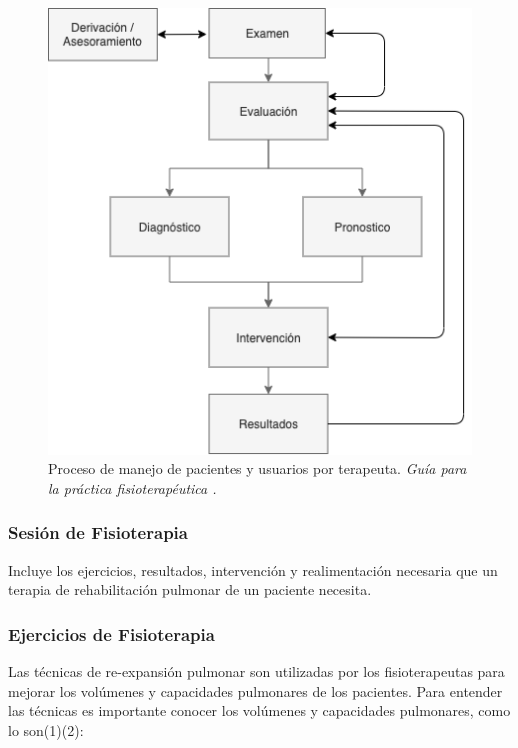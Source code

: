 \documentclass[12pt]{article}
\begin{document}
\begin{figure}[ht]
\centering
\includegraphics[scale=0.45]{imag/C4-Terapeuta.png}
\caption{Proceso de manejo de pacientes y usuarios por terapeuta. \textit{Guía para la práctica fisioterapéutica \cite{5}.}}
\label{2}
\end{figure}
\FloatBarrier





\subsubsection{Sesión de Fisioterapia}

Incluye los ejercicios, resultados, intervención y realimentación necesaria que un terapia de rehabilitación pulmonar de un paciente necesita.

\subsubsection{Ejercicios de Fisioterapia}

Las técnicas de re-expansión pulmonar son utilizadas por los fisioterapeutas para mejorar los volúmenes y capacidades pulmonares de los pacientes. Para entender las técnicas es importante conocer los volúmenes y capacidades pulmonares, como lo son(1)(2): 
\end{document}
